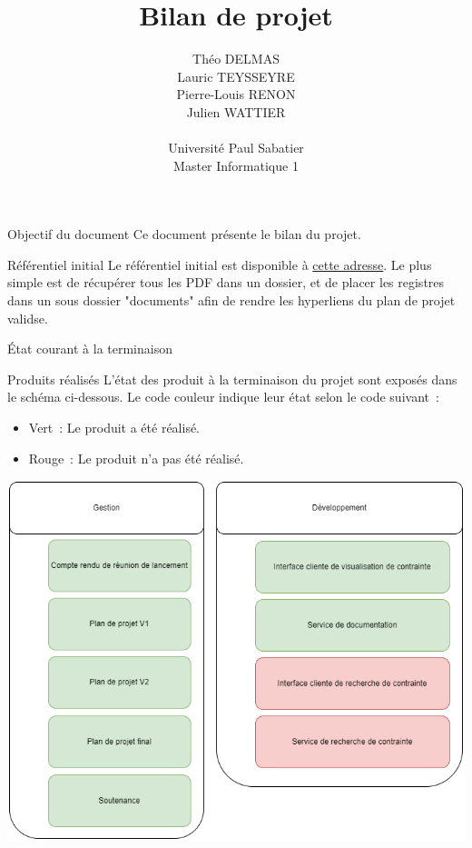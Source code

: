 \documentclass[]{article}
\title{Bilan de projet}
\author{
    Théo DELMAS\\
    Lauric TEYSSEYRE\\
    Pierre-Louis RENON\\
    Julien WATTIER\\
    \\
    Université Paul Sabatier\\
    Master Informatique 1\\
   }
\begin{document}
\maketitle
\newpage
\tableofcontents
\newpage

\begin{section}{Objectif du document}
 Ce document présente le bilan du projet.
\end{section}

{
\setlength{\parindent}{0pt} %
\begin{section}{Référentiel initial}
 Le référentiel initial est disponible à \href{https://github.com/Szyckaa/UE-PROJET-DOCS-GESTION/releases/tag/2.0.0}{cette adresse}.
 Le plus simple est de récupérer tous les PDF dans un dossier, et de placer les registres dans un sous dossier "documents" afin de rendre les hyperliens du plan de projet validse.
\end{section}

\begin{section}{État courant à la terminaison}
 \begin{subsection}{Produits réalisés}
     L’état des produit à la terminaison du projet sont exposés dans le schéma ci-dessous. Le code couleur indique leur état selon le code suivant :

     \begin{itemize}
         \item Vert : Le produit a été réalisé.
         \item Rouge : Le produit n’a pas été réalisé.
     \end{itemize}

     \includegraphics[scale=0.49]{IMG/PBS_final}


\end{subsection}
\end{section}}
\end{document}

